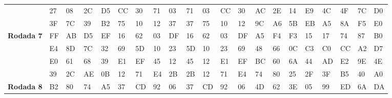 \documentclass[
    article,            %
    11pt,               %
    oneside,            %
    a4paper,            %
    english,            %
    brazil,             %
    sumario=tradicional,
    ]{abntex2}
\begin{document}
\begin{table}[H]
{\begin{tabular}{|
>{\columncolor[HTML]{C0C0C0}}l |llll|llll|llll|llll|llll|}
                                                     & 27            & 08             & 2C            & D5            & CC            & 30           & 71           & 03            & 71            & 03             & CC           & 30           & AC            & 2E            & 14            & E9           & 4C            & 4F            & 7C            & D0           \\
                                                     & 3F            & 7C            & 39            & B2            & 75            & 10           & 12           & 37           & 37            & 75            & 10           & 12           & 9C            & A6            & 5B            & EB           & A5            & 8A            & F5            & E0           \\ \hline
\textbf{Rodada 7}                                                    & FF            & AB            & D5            & EF            & 16            & 62           & 03            & DF           & 16            & 62            & 03            & DF           & A5            & F4            & F3            & 15           & 17            & 74            & 87            & B0           \\
                                                     & E4            & 8D            & 7C            & 32            & 69            & 5D           & 10           & 23           & 5D            & 10            & 23           & 69           & 48            & 66            & 0C            & C3           & C0            & CC            & A2            & D7           \\
                                                     & E0            & 61            & 68            & 39            & E1            & EF           & 45           & 12           & 45            & 12            & E1           & EF           & BC            & 60            & 6A            & 44           & AD            & E2            & 9E            & 4E           \\
                                                     & 39            & 2C            & AE            & 0B            & 12            & 71           & E4           & 2B           & 2B            & 12            & 71           & E4           & 74            & 80            & 25            & 2F           & 3F            & B5            & 40            & A0           \\ \hline
\textbf{Rodada 8}                                                   & B2            & 80            & 74            & A5            & 37            & CD           & 92           & 06            & 37            & CD            & 92           & 06            & 4D            & 62            & 3E            & 05            & 99            & ED            & 6A            & DA           \\

\end{tabular}}
\end{table}
\end{document}
